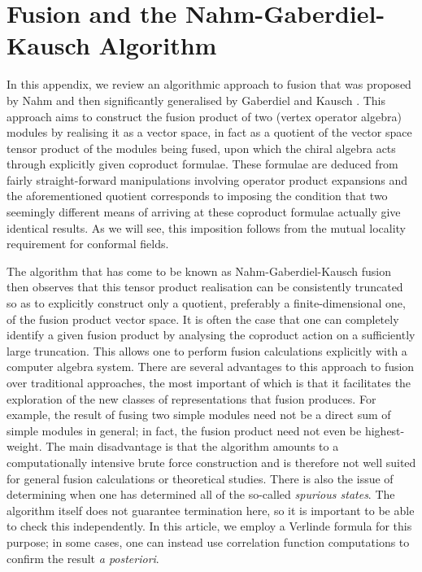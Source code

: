 \documentclass[a4paper,reqno,12pt]{report}
\theoremstyle{definition}
\numberwithin{equation}{section}
\newcommand{\opes}{operator product expansions}
\newcommand{\hw}{highest-weight}
\newcommand{\voa}{vertex operator algebra}
\newcommand{\NGK}{Nahm-Gaberdiel-Kausch}
\theoremstyle{plain}
\begin{document}
\appendix

\chapter{Fusion and the \NGK{} Algorithm} \label{app:Fusion}

In this appendix, we review an algorithmic approach to fusion that was proposed by Nahm \cite{NahQua94} and then significantly generalised by Gaberdiel and Kausch \cite{GabInd96}.  This approach aims to construct the fusion product of two (\voa{}) modules by realising it as a vector space, in fact as a quotient of the vector space tensor product of the modules being fused, upon which the chiral algebra acts through explicitly given coproduct formulae.  These formulae are deduced from fairly straight-forward manipulations involving \opes{} \cite{GabFus94,GabFus94b} and the aforementioned quotient corresponds to imposing the condition that two seemingly different means of arriving at these coproduct formulae actually give identical results.  As we will see, this imposition follows from the mutual locality requirement for conformal fields.

The algorithm that has come to be known as \NGK{} fusion then observes that this tensor product realisation can be consistently truncated so as to explicitly construct only a quotient, preferably a finite-dimensional one, of the fusion product vector space.  It is often the case that one can completely identify a given fusion product by analysing the coproduct action on a sufficiently large truncation.  This allows one to perform fusion calculations explicitly with a computer algebra system.  There are several advantages to this approach to fusion over traditional approaches, the most important of which is that it facilitates the exploration of the new classes of representations that fusion produces.  For example, the result of fusing two simple modules need not be a direct sum of simple modules in general; in fact, the fusion product need not even be \hw{}.  The main disadvantage is that the algorithm amounts to a computationally intensive brute force construction and is therefore not well suited for general fusion calculations or theoretical studies.  There is also the issue of determining when one has determined all of the so-called \emph{spurious states}.  The algorithm itself does not guarantee termination here, so it is important to be able to check this independently.  In this article, we employ a Verlinde formula for this purpose; in some cases, one can instead use correlation function computations to confirm the result \emph{a posteriori}.
\end{document}

